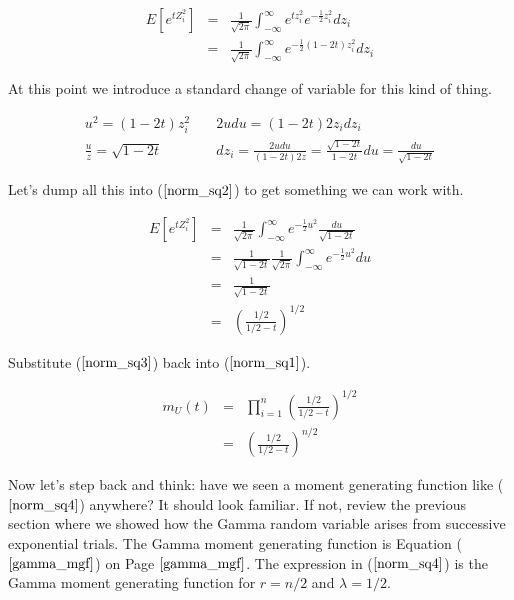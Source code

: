 \documentclass[]{article}
\begin{document}
\begin{eqnarray}
E \left[ e^{t Z_i^2} \right] &= & \frac{1}{\sqrt{2\pi}}
     \int_{-\infty}^{\infty} e^{tz_i^2} e^{-\frac{1}{2} z_i^2}
     dz_i \nonumber \\
  &= & \frac{1}{\sqrt{2\pi}}
     \int_{-\infty}^{\infty} e^{-\frac{1}{2} (1-2t)z_i^2}
      dz_i \label{norm_sq2}
\end{eqnarray}

At this point we introduce a standard change of variable for
this kind of thing.

\begin{eqnarray*}
u^2 = (1-2t)z_i^2 & \; &2udu = (1-2t)2z_idz_i \\
\frac{u}{z} = \sqrt{1-2t} & \; &dz_i = \frac{2udu}{(1-2t)2z}
    = \frac{\sqrt{1-2t}}{1-2t} du = \frac{du}{\sqrt{1-2t}}
\end{eqnarray*}

Let's dump all this into ($\ref{norm_sq2}$) to get something
we can work with.

\begin{eqnarray}
E \left[ e^{t Z_i^2} \right] &= & \frac{1}{\sqrt{2\pi}}
     \int_{-\infty}^{\infty} e^{-\frac{1}{2} u^2}
      \frac{du}{\sqrt{1-2t}} \nonumber \\
  &= & \frac{1}{\sqrt{1-2t}} \frac{1}{\sqrt{2\pi}}
     \int_{-\infty}^{\infty} e^{-\frac{1}{2} u^2} du \nonumber \\
  &= & \frac{1}{\sqrt{1-2t}}  \nonumber  \\
  &= & \left( \frac{1/2}{1/2 - t} \right)^{1/2} \label{norm_sq3}
\end{eqnarray}

Substitute ($\ref{norm_sq3}$) back into ($\ref{norm_sq1}$).

\begin{eqnarray}
m_U(t) &= &\prod_{i=1}^n \left( \frac{1/2}{1/2 - t} \right)^{1/2}
   \nonumber \\
   &= & \left( \frac{1/2}{1/2 - t} \right)^{n/2} \label{norm_sq4}
\end{eqnarray}

Now let's step back and think: have we seen a moment generating
function like ($\ref{norm_sq4}$) anywhere?  It should look familiar.
If not, review the previous section where we showed how the
Gamma random variable arises from successive exponential trials.
The Gamma moment generating function is 
Equation ($\ref{gamma_mgf}$) on Page $\pageref{gamma_mgf}$.
The expression in ($\ref{norm_sq4}$) is the Gamma moment
generating function for $r = n/2$ and $\lambda = 1/2$.
\end{document}
